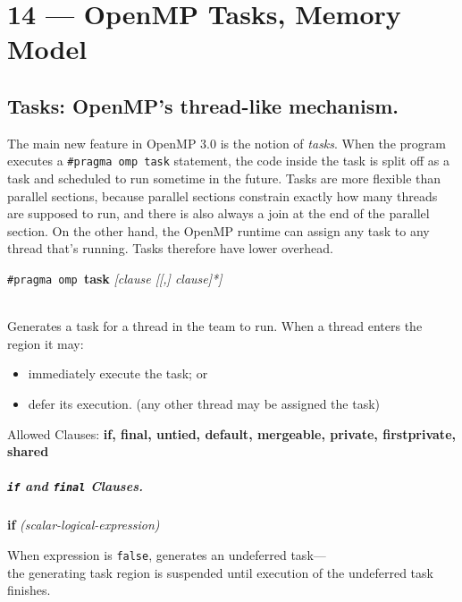 \documentclass[a4paper]{report}
\begin{document}
\chapter*{14 --- OpenMP Tasks, Memory Model}


\section*{Tasks: OpenMP's thread-like mechanism.}
The main new feature in OpenMP 3.0 is the notion of \emph{tasks}. When
the program executes a \verb+#pragma omp task+ statement, the code
inside the task is split off as a task and scheduled to run sometime
in the future. Tasks are more flexible than parallel sections, because
parallel sections constrain exactly how many threads are supposed to
run, and there is also always a join at the end of the parallel
section.  On the other hand, the OpenMP runtime can assign any task to
any thread that's running. Tasks therefore have lower overhead.


  \begin{center}
    {\tt \#pragma omp }{\bf task} {\it [clause [[,] clause]*]}
  \end{center}~\\

Generates a task for a thread in the team to run.
     When a thread enters the region it may:
\begin{itemize}
        \item immediately execute the task; or
        \item defer its execution. (any other thread may be assigned the task)
\end{itemize}

  Allowed Clauses: {\bf if, final, untied, default, mergeable, private,
  firstprivate, shared}

\paragraph{{\tt if} and {\tt final} Clauses.}

  \begin{center}
  {\bf if} {\it(scalar-logical-expression)}
  \end{center}

    When expression is {\tt false}, generates an undeferred task---\\
    the generating task region is suspended until execution of the
      undeferred task finishes.\\[1em]
\end{document}
